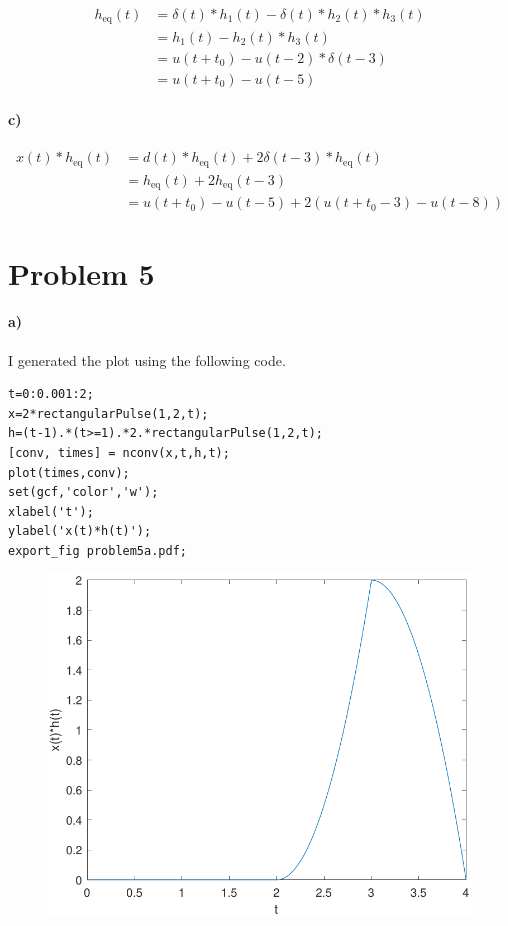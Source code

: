 \documentclass[12pt]{article}
\begin{document}
\begin{align*}
    h_{\text{eq}}(t)&=\delta(t)*h_1(t) - \delta(t)*h_2(t)*h_3(t)\\
    &=h_1(t)-h_2(t)*h_3(t)\\
    &=u(t+t_0)-u(t-2)*\delta(t-3)\\
    &=u(t+t_0)-u(t-5)
\end{align*}

\paragraph{c)}

\begin{align*}
    x(t)*h_{\text{eq}}(t)&=d(t)*h_{\text{eq}}(t)+2\delta(t-3)*h_{\text{eq}}(t)\\
    &=h_{\text{eq}}(t)+2h_{\text{eq}}(t-3)\\
    &=u(t+t_0)-u(t-5)+2(u(t+t_0-3)-u(t-8))
\end{align*}

\pagebreak

\section*{Problem 5}

\paragraph{a)}

I generated the plot using the following code.
\begin{verbatim}
t=0:0.001:2;
x=2*rectangularPulse(1,2,t);
h=(t-1).*(t>=1).*2.*rectangularPulse(1,2,t);
[conv, times] = nconv(x,t,h,t);
plot(times,conv);
set(gcf,'color','w');
xlabel('t');
ylabel('x(t)*h(t)');
export_fig problem5a.pdf;
\end{verbatim}
\begin{figure}[H]
    \begin{center}
        \includegraphics[width=4.5in]{problem5a.pdf}
    \end{center}
\end{figure}
\end{document}
